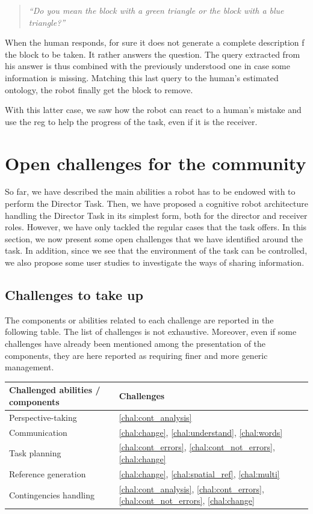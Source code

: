 \begin{quote} 
\centering 
\textit{``Do you mean the block with a green triangle or the block with a blue triangle?''}
\end{quote}

When the human responds, for sure it does not generate a complete description f the block to be taken. It rather answers the question. The query extracted from his answer is thus combined with the previously understood one in case some information is missing. Matching this last query to the human's estimated ontology, the robot finally get the block to remove.

With this latter case, we saw how the robot can react to a human's mistake and use the \acrshort{reg} to help the progress of the task, even if it is the receiver.

\section{Open challenges for the community}

So far, we have described the main abilities a robot has to be endowed with to perform the Director Task. Then, we have proposed a cognitive robot architecture handling the Director Task in its simplest form, both for the director and receiver roles. However, we have only tackled the regular cases that the task offers. In this section, we now present some open challenges that we have identified around the task. In addition, since we see that the environment of the task can be controlled, we also propose some user studies to investigate the ways of sharing information.

\subsection{Challenges to take up}

The components or abilities related to each challenge are reported in the following table. The list of challenges is not exhaustive. Moreover, even if some challenges have already been mentioned among the presentation of the components, they are here reported as requiring finer and more generic management.

\begin{center}
 \begin{tabular}{||l | l ||} 
 \hline
 Challenged abilities / components & Challenges \\ [0.5ex]
 \hline\hline
 Perspective-taking & \ref{chal:cont_analysis}  \\ 
 \hline
 Communication & \ref{chal:change}, \ref{chal:understand}, \ref{chal:words}\\
 \hline
 Task planning & \ref{chal:cont_errors}, \ref{chal:cont_not_errors}, \ref{chal:change} \\
 \hline
 Reference generation & \ref{chal:change}, \ref{chal:spatial_ref}, \ref{chal:multi} \\
 \hline
 Contingencies handling & \ref{chal:cont_analysis}, \ref{chal:cont_errors}, \ref{chal:cont_not_errors}, \ref{chal:change} \\ [1ex]
 \hline
\end{tabular}
\end{center}

